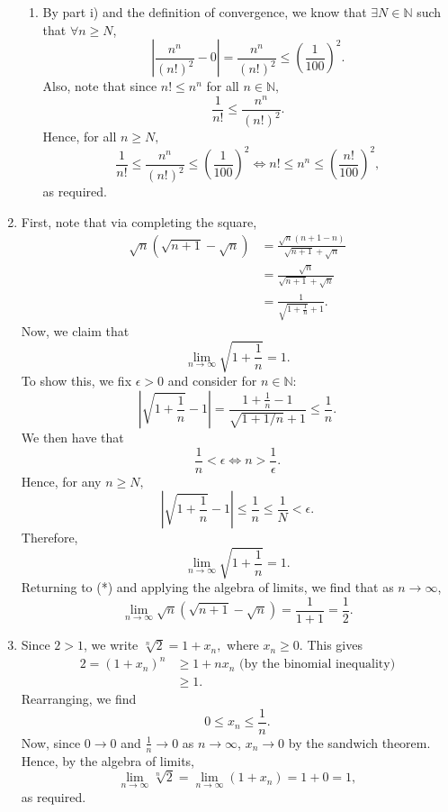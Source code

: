 \documentclass[
  12pt,
  a4paper]{extarticle}
\theoremstyle{plain}
\theoremstyle{definition}
\theoremstyle{plain}
\theoremstyle{plain}
\theoremstyle{plain}
\theoremstyle{plain}
\theoremstyle{definition}
\theoremstyle{definition}
\theoremstyle{remark}
\theoremstyle{remark}
\renewcommand{\;}{\,}
\begin{document}
\begin{enumerate}
\begin{enumerate}
  \item
    By part i) and the definition of convergence, we know that \(\exists N \in \mathbb{N}\) such that \(\forall n \geq N\), \[\left\lvert\frac{n^n}{(n!)^2} - 0 \right\rvert =  \frac{n^n}{(n!)^2} \leq \left(\frac{1}{100}\right)^2.\] Also, note that since \(n! \leq n^n\) for all \(n \in \mathbb{N},\) \[\frac{1}{n!} \leq \frac{n^n}{(n!)^2}.\] Hence, for all \(n \geq N,\) \[\frac{1}{n!} \leq \frac{n^n}{(n!)^2} \leq \left(\frac{1}{100}\right)^2 \Longleftrightarrow n! \leq n^n \leq \left(\frac{n!}{100}\right)^2,\] as required.
  \end{enumerate}
\item
  First, note that via completing the square, \begin{align}\sqrt{n}(\sqrt{n+1} - \sqrt{n}) &= \frac{\sqrt{n}(n+1 - n)}{\sqrt{n+1} + \sqrt{n}}\nonumber\\ &= \frac{\sqrt{n}}{\sqrt{n+1} + \sqrt{n}}\nonumber\\ &= \frac{1}{\sqrt{1 + \frac{1}{n}} + 1}.\tag{*}\end{align} Now, we claim that \[\lim_{n \to \infty} \sqrt{1 + \frac{1}{n}} = 1.\] To show this, we fix \(\epsilon > 0\) and consider for \(n \in \mathbb{N}:\) \[\left\lvert \sqrt{1 + \frac{1}{n}} - 1\right\rvert = \frac{1 + \frac{1}{n}-1}{\sqrt{1 + 1/n}+1} \leq \frac{1}{n}.\] We then have that \[\frac{1}{n} < \epsilon \Longleftrightarrow n > \frac{1}{\epsilon}.\] Hence, for any \(n \geq N,\) \[\left\lvert \sqrt{1 + \frac{1}{n}} - 1\right\rvert \leq \frac{1}{n} \leq \frac{1}{N} < \epsilon.\] Therefore, \[\lim_{n \to \infty} \sqrt{1 + \frac{1}{n}} = 1.\] Returning to (*) and applying the algebra of limits, we find that as \(n \to \infty\), \[\lim_{n \to \infty}\sqrt{n}(\sqrt{n+1} - \sqrt{n}) = \frac{1}{1+1} = \frac{1}{2}.\]
\item
  Since \(2 > 1\), we write \(\sqrt[n]{2} = 1 + x_n,\) where \(x_n \geq 0\). This gives \begin{align*}
  2 = (1 + x_n)^n &\geq 1 + nx_n \;\; \text{(by the binomial inequality)}\\ &\geq 1. \end{align*} Rearranging, we find \[0 \leq x_n \leq \frac{1}{n}.\] Now, since \(0 \to 0\) and \(\frac{1}{n} \to 0\) as \(n \to \infty\), \(x_n \to 0\) by the sandwich theorem. Hence, by the algebra of limits, \[\lim_{n \to \infty} \sqrt[n]{2} = \lim_{n\to\infty}(1 + x_n) = 1 + 0 = 1,\] as required.
\end{enumerate}
\end{document}
